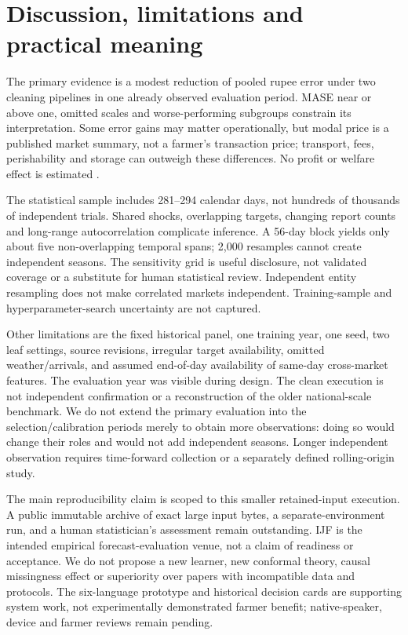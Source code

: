 \section{Discussion, limitations and practical meaning}\label{sec:discussion}
The primary evidence is a modest reduction of pooled rupee error under two cleaning pipelines in one already observed evaluation period. MASE near or above one, omitted scales and worse-performing subgroups constrain its interpretation. Some error gains may matter operationally, but modal price is a published market summary, not a farmer's transaction price; transport, fees, perishability and storage can outweigh these differences. No profit or welfare effect is estimated \cite{fafchamps2012sms,mitra2018asymmetric}.

The statistical sample includes 281--294 calendar days, not hundreds of thousands of independent trials. Shared shocks, overlapping targets, changing report counts and long-range autocorrelation complicate inference. A 56-day block yields only about five non-overlapping temporal spans; 2,000 resamples cannot create independent seasons. The sensitivity grid is useful disclosure, not validated coverage or a substitute for human statistical review. Independent entity resampling does not make correlated markets independent. Training-sample and hyperparameter-search uncertainty are not captured.

Other limitations are the fixed historical panel, one training year, one seed, two leaf settings, source revisions, irregular target availability, omitted weather/arrivals, and assumed end-of-day availability of same-day cross-market features. The evaluation year was visible during design. The clean execution is not independent confirmation or a reconstruction of the older national-scale benchmark. We do not extend the primary evaluation into the selection/calibration periods merely to obtain more observations: doing so would change their roles and would not add independent seasons. Longer independent observation requires time-forward collection or a separately defined rolling-origin study.

The main reproducibility claim is scoped to this smaller retained-input execution. A public immutable archive of exact large input bytes, a separate-environment run, and a human statistician's assessment remain outstanding. IJF is the intended empirical forecast-evaluation venue, not a claim of readiness or acceptance. We do not propose a new learner, new conformal theory, causal missingness effect or superiority over papers with incompatible data and protocols. The six-language prototype and historical decision cards are supporting system work, not experimentally demonstrated farmer benefit; native-speaker, device and farmer reviews remain pending.
